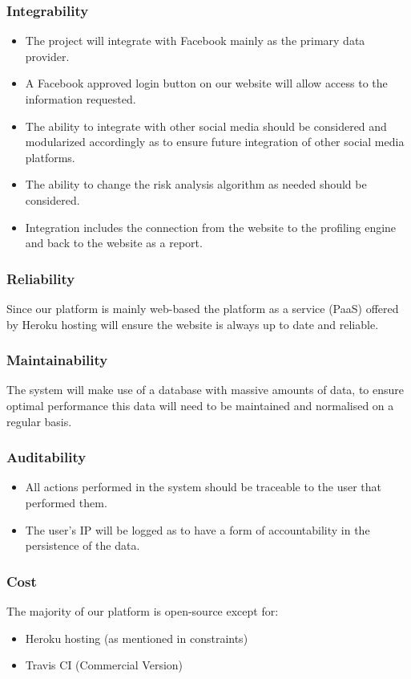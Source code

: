 \documentclass{article}
\begin{document}
		\subsubsection{Integrability}
		\begin{itemize}
			\item The project will integrate with Facebook mainly as the primary data provider.
			\item A Facebook approved login button on our website will allow access to the information requested. 
			\item The ability to integrate with other social media should be considered and modularized accordingly as to ensure future integration of other social media platforms. 
		\item The ability to change the risk analysis algorithm as needed should be considered.
		\item Integration includes the connection from the website to the profiling engine and back to the website as a report.
		\end{itemize}		
		\subsubsection{Reliability}
		Since our platform is mainly web-based the platform as a service (PaaS) offered by Heroku hosting will ensure the website is always up to date and reliable.
		\subsubsection{Maintainability}
		The system will make use of a database with massive amounts of data, to ensure optimal performance this data will need to be maintained and normalised on a regular basis.
		\subsubsection{Auditability}
		\begin{itemize}
			\item All actions performed in the system should be traceable to the user that performed them.
			\item The user's IP  will be logged as to have a form of accountability in the persistence of the data.
		\end{itemize}
		\subsubsection{Cost}
		The majority of our platform is open-source except for:
		\begin{itemize}
			\item Heroku hosting (as mentioned in constraints)
			\item Travis CI (Commercial Version)		
		\end{itemize}
\end{document}
